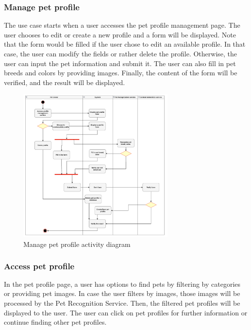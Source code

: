 \subsubsection{Manage pet profile}

The use case starts when a user accesses the pet profile management page. The user chooses to edit or create a new profile and a form will be displayed. Note that the form would be filled if the user chose to edit an available profile. In that case, the user can modify the fields or rather delete the profile. Otherwise, the user can input the pet information and submit it. The user can also fill in pet breeds and colors by providing images. Finally, the content of the form will be verified, and the result will be displayed.

\begin{figure}[H]
  \centering
  \includegraphics[width=0.7\textwidth]{Figures/manage_pet.png}
  \caption{Manage pet profile activity diagram}
  \label{fig:manage-pet}
\end{figure}

\subsubsection{Access pet profile}

In the pet profile page, a user has options to find pets by filtering by categories or providing pet images. In case the user filters by images, those images will be processed by the Pet Recognition Service. Then, the filtered pet profiles will be displayed to the user. The user can click on pet profiles for further information or continue finding other pet profiles.

